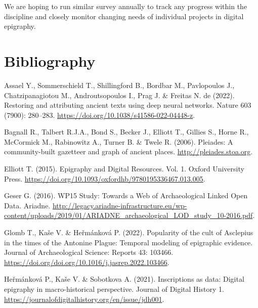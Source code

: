 \documentclass[
  12pt,
]{scrreprt}
\newlength{\cslhangindent}
\newlength{\cslentryspacingunit} %
\newenvironment{CSLReferences}[2] %
 {%
  \setlength{\parindent}{0pt}
  \ifodd #1
  \let\oldpar\par
  \def\par{\hangindent=\cslhangindent\oldpar}
  \fi
  \setlength{\parskip}{#2\cslentryspacingunit}
 }%
 {}
\begin{document}
We are hoping to run similar survey annually to track any progress
within the discipline and closely monitor changing needs of individual
projects in digital epigraphy.

\hypertarget{bibliography}{%
\chapter{Bibliography}\label{bibliography}}

\hypertarget{refs}{}
\begin{CSLReferences}{1}{0}
\leavevmode{}%
Assael Y., Sommerschield T., Shillingford B., Bordbar M., Pavlopoulos
J., Chatzipanagiotou M., Androutsopoulos I., Prag J. \& Freitas N. de
(2022). Restoring and attributing ancient texts using deep neural
networks. Nature 603 (7900): 280--283.
\url{https://doi.org/10.1038/s41586-022-04448-z}.

\leavevmode{}%
Bagnall R., Talbert R.J.A., Bond S., Becker J., Elliott T., Gillies S.,
Horne R., McCormick M., Rabinowitz A., Turner B. \& Twele R. (2006).
Pleiades: {A} community-built gazetteer and graph of ancient places.
\url{http://pleiades.stoa.org}.

\leavevmode{}%
Elliott T. (2015). Epigraphy and {Digital} {Resources}. Vol. 1. Oxford
University Press.
\url{https://doi.org/10.1093/oxfordhb/9780195336467.013.005}.

\leavevmode{}%
Geser G. (2016). {WP15} {Study}: {Towards} a {Web} of {Archaeological}
{Linked} {Open} {Data}. Ariadne.
\url{http://legacy.ariadne-infrastructure.eu/wp-content/uploads/2019/01/ARIADNE_archaeological_LOD_study_10-2016.pdf}.

\leavevmode{}%
Glomb T., Kaše V. \& Heřmánková P. (2022). Popularity of the cult of
{Asclepius} in the times of the {Antonine} {Plague}: {Temporal} modeling
of epigraphic evidence. Journal of Archaeological Science: Reports 43:
103466. \url{https://doi.org/doi.org/10.1016/j.jasrep.2022.103466}.

\leavevmode{}%
Heřmánková P., Kaše V. \& Sobotkova A. (2021). Inscriptions as data:
Digital epigraphy in macro-historical perspective. Journal of Digital
History 1. \url{https://journalofdigitalhistory.org/en/issue/jdh001}.


\end{CSLReferences}
\end{document}
